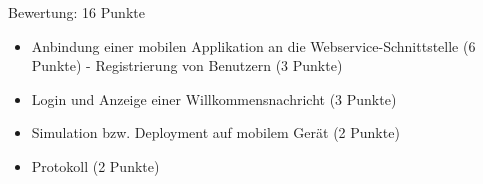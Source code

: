 Bewertung: 16 Punkte
\begin{itemize}
    \item Anbindung einer mobilen Applikation an die Webservice-Schnittstelle (6 Punkte) - Registrierung von Benutzern (3 Punkte)
    \item Login und Anzeige einer Willkommensnachricht (3 Punkte)
    \item Simulation bzw. Deployment auf mobilem Gerät (2 Punkte)
    \item Protokoll (2 Punkte)
\end{itemize}

\clearpage
